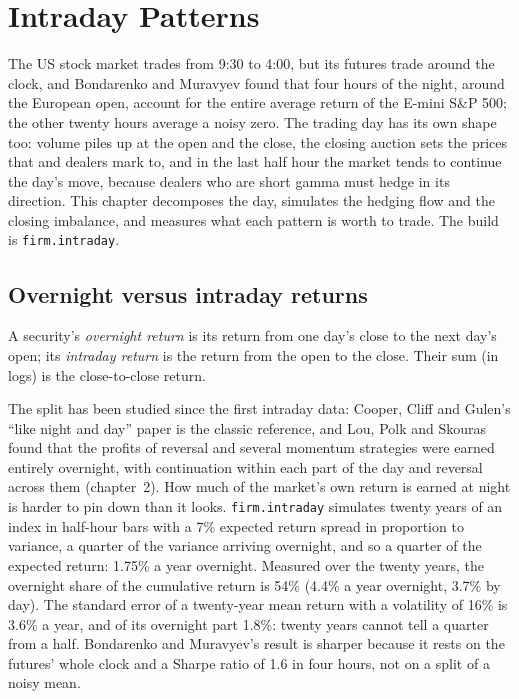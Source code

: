 \chapter{Intraday Patterns}\label{ch:s1:intraday-patterns}

The US stock market trades from 9:30 to 4:00, but its futures trade around the clock, and Bondarenko and Muravyev found that four hours of the night,
around the European open, account for the entire average return of the E-mini S\&P 500; the other twenty hours average a noisy zero. The trading day has
its own shape too: volume piles up at the open and the close, the closing auction sets the prices that  and dealers mark to, and in the last
half hour the market tends to continue the day's move, because dealers who are short gamma must hedge in its direction. This chapter decomposes the
day, simulates the hedging flow and the closing imbalance, and measures what each pattern is worth to trade. The build is \texttt{firm.intraday}.

\section{Overnight versus intraday returns}

\begin{definition}\label{def:s1:intraday-patterns:returns}
A security's \emph{overnight return} is its return from one day's close to the next day's open; its \emph{intraday
return} is the return from the open to the close. Their sum (in logs) is the close-to-close return.
\end{definition}

The split has been studied since the first intraday data: Cooper, Cliff and Gulen's ``like night and day'' paper is the classic reference, and Lou, Polk and
Skouras found that the profits of reversal and several momentum strategies were earned entirely overnight, with continuation within each part of the day
and reversal across them (chapter~2). How much of the market's own return is earned at night is harder to pin down than it looks. \texttt{firm.intraday}
simulates twenty years of an index in half-hour bars with a 7\% expected return spread in proportion to variance, a quarter of the variance arriving
overnight, and so a quarter of the expected return: 1.75\% a year overnight. Measured over the twenty years, the overnight share of the cumulative return is
54\% (4.4\% a year overnight, 3.7\% by day). The standard error of a twenty-year mean return with a volatility of 16\% is 3.6\% a year, and of its overnight
part 1.8\%: twenty years cannot tell a quarter from a half. Bondarenko and Muravyev's result is sharper because it rests on the futures' whole clock and
a Sharpe ratio of 1.6 in four hours, not on a split of a noisy mean.

